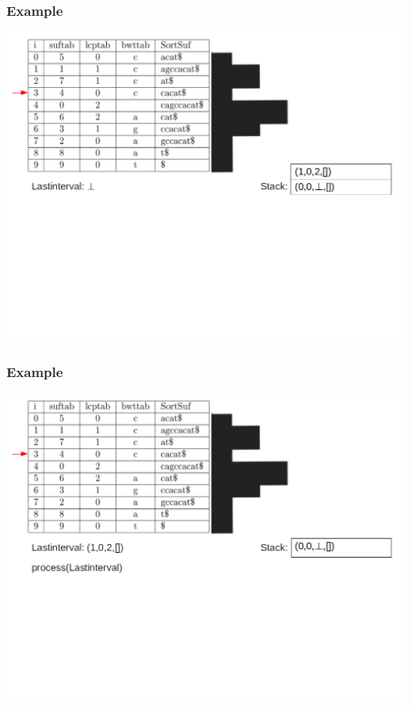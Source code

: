 \documentclass[compress,handout]{beamer} %
\begin{document}
\begin{frame}
	\frametitle{Example}
	\includegraphics[width=\textwidth, height=\textheight, keepaspectratio=true]{traversal_4}
\end{frame}

\begin{frame}
	\frametitle{Example}
	\includegraphics[width=\textwidth, height=\textheight, keepaspectratio=true]{traversal_5}
\end{frame}
\end{document}
